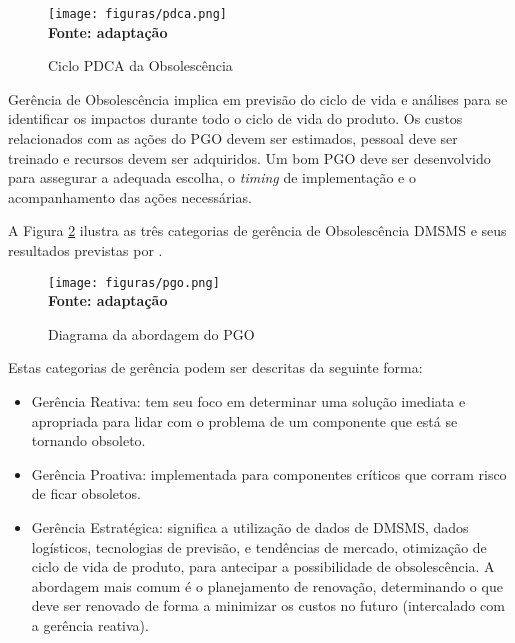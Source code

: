 \begin{figure}[ht]
	\centering	
	\caption[\hspace{0.1cm}PDCA.]{Ciclo PDCA da Obsolescência}
	\vspace{-0.4cm}
	\texttt{[image: figuras/pdca.png]}
	\vspace{-0.2cm}
	\\\textbf{\footnotesize Fonte: \cite{sandborn2012} adaptação }	
	\label{fig:figurapdca}
\end{figure}
\vspace{-0.5cm}
\newpage 
Gerência de Obsolescência implica em previsão do ciclo de vida e análises para se identificar os impactos durante todo o ciclo de vida do produto. Os custos relacionados com as ações do PGO devem ser estimados, pessoal deve ser treinado e recursos devem ser adquiridos. Um bom PGO deve ser desenvolvido para assegurar a adequada escolha, o \textit{timing} de implementação e o acompanhamento das ações necessárias.

A Figura \ref{fig:figurapgo} ilustra as três categorias de gerência de Obsolescência DMSMS e seus resultados previstas por .


\begin{figure}[ht]
	\centering	
	\caption[\hspace{0.1cm}PGO.]{Diagrama da abordagem do PGO}
	\vspace{-0.4cm}
	\texttt{[image: figuras/pgo.png]}
	\vspace{-0.2cm}
	\\\textbf{\footnotesize Fonte: \cite{sandborn2008} adaptação }	
	\label{fig:figurapgo}
\end{figure}
\vspace{-0.5cm}

Estas categorias de gerência podem ser descritas da seguinte forma: \cite{sandborn2012}
\begin{itemize} 
    \item Gerência Reativa: tem seu foco em determinar uma solução imediata e apropriada para lidar com o problema de um componente que está se tornando obsoleto.
    
    \item Gerência Proativa: implementada para componentes críticos que corram risco de ficar obsoletos.
    
    \item Gerência Estratégica: significa a utilização de dados de DMSMS, dados logísticos, tecnologias de previsão, e tendências de mercado, otimização de ciclo de vida de produto, para antecipar a possibilidade de obsolescência. A abordagem mais comum é o planejamento de renovação, determinando o que deve ser renovado de forma a minimizar os custos no futuro (intercalado com a gerência reativa).
    
\end{itemize}
